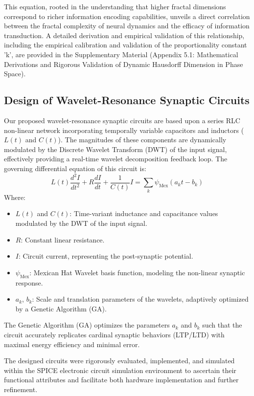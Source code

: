 \documentclass{article}
\begin{document}
This equation, rooted in the understanding that higher fractal dimensions correspond to richer information encoding capabilities, unveils a direct correlation between the fractal complexity of neural dynamics and the efficacy of information transduction. A detailed derivation and empirical validation of this relationship, including the empirical calibration and validation of the proportionality constant 'k', are provided in the Supplementary Material (Appendix 5.1: Mathematical Derivations and Rigorous Validation of Dynamic Hausdorff Dimension in Phase Space).

\subsection{Design of Wavelet-Resonance Synaptic Circuits}

Our proposed wavelet-resonance synaptic circuits are based upon a series RLC non-linear network incorporating temporally variable capacitors and inductors ($L(t)$ and $C(t)$). The magnitudes of these components are dynamically modulated by the Discrete Wavelet Transform (DWT) of the input signal, effectively providing a real-time wavelet decomposition feedback loop. The governing differential equation of this circuit is:
\begin{equation}
L(t) \frac{d^2 I}{dt^2} + R \frac{dI}{dt} + \frac{1}{C(t)} I = \sum_k \psi_\text{Mex}(a_k t - b_k)
\end{equation}
Where:
\begin{itemize}
    \item $L(t)$ and $C(t)$: Time-variant inductance and capacitance values modulated by the DWT of the input signal.
    \item $R$: Constant linear resistance.
    \item $I$: Circuit current, representing the post-synaptic potential.
    \item $\psi_\text{Mex}$: Mexican Hat Wavelet basis function, modeling the non-linear synaptic response.
    \item $a_k$, $b_k$: Scale and translation parameters of the wavelets, adaptively optimized by a Genetic Algorithm (GA).
\end{itemize}

The Genetic Algorithm (GA) optimizes the parameters $a_k$ and $b_k$ such that the circuit accurately replicates cardinal synaptic behaviors (LTP/LTD) with maximal energy efficiency and minimal error.

The designed circuits were rigorously evaluated, implemented, and simulated within the SPICE electronic circuit simulation environment to ascertain their functional attributes and facilitate both hardware implementation and further refinement.
\end{document}
